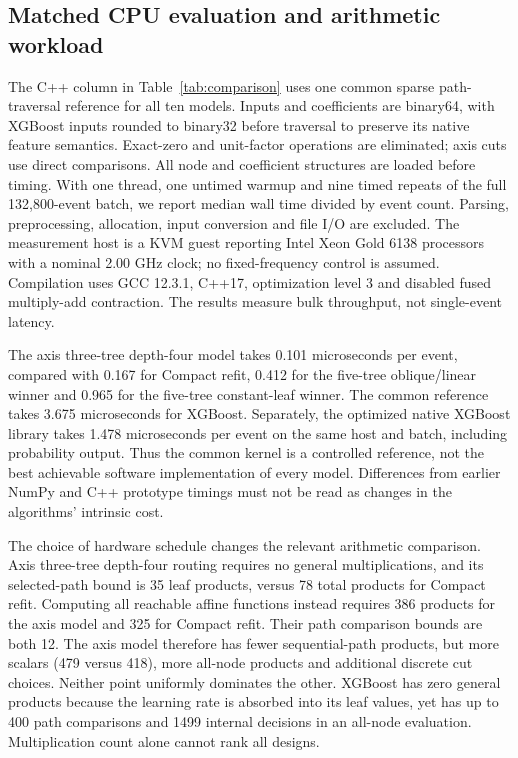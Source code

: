 \subsection{Matched CPU evaluation and arithmetic workload}
\label{sec:cost}
The C++ column in Table~\ref{tab:comparison} uses one common sparse path-traversal
reference for all ten models. Inputs and coefficients are binary64, with
XGBoost inputs rounded to binary32 before traversal to preserve its native
feature semantics. Exact-zero and unit-factor operations are eliminated;
axis cuts use direct comparisons. All node and coefficient structures are
loaded before timing. With one thread, one untimed warmup and nine timed
repeats of the full 132,800-event batch, we report median wall time divided
by event count. Parsing, preprocessing, allocation, input conversion and file
I/O are excluded. The measurement host is a KVM guest reporting Intel Xeon
Gold 6138 processors with a nominal 2.00 GHz clock; no fixed-frequency control
is assumed. Compilation uses GCC 12.3.1, C++17, optimization level 3 and disabled
fused multiply-add contraction. The results measure bulk throughput, not
single-event latency.

The axis three-tree depth-four model takes 0.101 microseconds per event,
compared with 0.167 for Compact refit, 0.412 for the five-tree oblique/linear
winner and 0.965 for the five-tree constant-leaf winner. The common reference
takes 3.675 microseconds for XGBoost. Separately, the optimized native XGBoost
library takes 1.478 microseconds per event on the same host and batch,
including probability output. Thus the common kernel is a controlled
reference, not the best achievable software implementation of every model.
Differences from earlier NumPy and C++ prototype timings must not be read as
changes in the algorithms' intrinsic cost.

The choice of hardware schedule changes the relevant arithmetic comparison.
Axis three-tree depth-four routing requires no general multiplications, and
its selected-path bound is 35 leaf products, versus 78 total products for
Compact refit. Computing all reachable affine functions instead requires 386
products for the axis model and 325 for Compact refit. Their path comparison
bounds are both 12. The axis model therefore has fewer sequential-path
products, but more scalars (479 versus 418), more all-node products and
additional discrete cut choices. Neither point uniformly dominates the other.
XGBoost has zero general products because the learning rate is absorbed into
its leaf values, yet has up to 400 path comparisons and 1499 internal decisions
in an all-node evaluation. Multiplication count alone cannot rank all designs.

